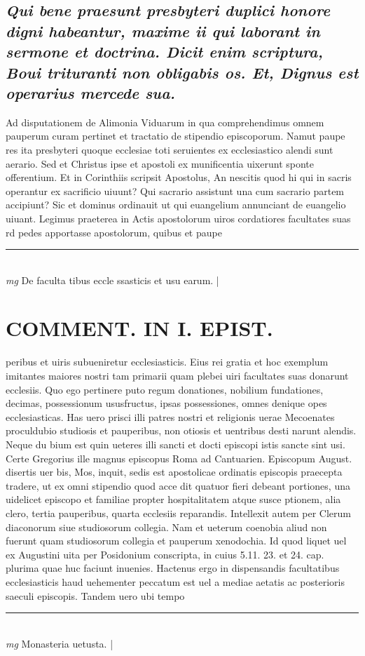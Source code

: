 \documentclass{article}
\begin{document}
\begin{pages}
\subsection*{\textit{Qui bene praesunt presbyteri duplici honore digni habeantur, maxime ii qui laborant in sermone et doctrina. Dicit enim scriptura, Boui trituranti non obligabis os. Et, Dignus est operarius mercede sua. }}\pstart Ad disputationem de Alimonia Viduarum in qua comprehendimus omnem pauperum curam pertinet et tractatio de stipendio episcoporum. Namut paupe res ita presbyteri quoque ecclesiae toti seruientes ex ecclesiastico alendi sunt aerario. Sed et Christus ipse et apostoli ex munificentia uixerunt sponte offerentium. Et in Corinthiis scripsit Apostolus, An nescitis quod hi qui in sacris operantur ex sacrificio uiuunt? Qui sacrario assistunt una cum sacrario partem accipiunt? Sic et dominus ordinauit ut qui euangelium annunciant de euangelio uiuant. Legimus praeterea in Actis apostolorum uiros cordatiores facultates suas rd pedes apportasse apostolorum, quibus et paupe\pend
\vspace{0.5cm}\noindent
\vspace{0.2cm}\rule{1cm}{0.2pt}\\ 
\hspace{0.2cm}\textit{mg}
\footnotesize De faculta tibus eccle ssasticis et usu earum. 
\normalsize| 
\section*{COMMENT. IN I. EPIST. }\pstart peribus et uiris subueniretur ecclesiasticis. Eius rei gratia et hoc exemplum imitantes maiores nostri tam primarii quam plebei uiri facultates suas donarunt ecclesiis. Quo ego pertinere puto regum donationes, nobilium fundationes, decimas, possessionum ususfructus, ipsas possessiones, omnes denique opes ecclesiasticas. Has uero prisci illi patres nostri et religionis uerae Mecoenates proculdubio studiosis et pauperibus, non otiosis et uentribus desti narunt alendis. Neque du bium est quin ueteres illi sancti et docti episcopi istis sancte sint usi. Certe Gregorius ille magnus episcopus Roma ad Cantuarien. Episcopum August. disertis uer bis, Mos, inquit, sedis est apostolicae ordinatis episcopis praecepta tradere, ut ex omni stipendio quod acce dit quatuor fieri debeant portiones, una uidelicet episcopo et familiae propter hospitalitatem atque susce ptionem, alia clero, tertia pauperibus, quarta ecclesiis reparandis. Intellexit autem per Clerum diaconorum siue studiosorum collegia. Nam et ueterum coenobia aliud non fuerunt quam studiosorum collegia et pauperum xenodochia. Id quod liquet uel ex Augustini uita per Posidonium conscripta, in cuius 5.11. 23. et 24. cap. plurima quae huc faciunt inuenies. Hactenus ergo in dispensandis facultatibus ecclesiasticis haud uehementer peccatum est uel a mediae aetatis ac posterioris saeculi episcopis. Tandem uero ubi tempo\pend
\vspace{0.5cm}\noindent
\vspace{0.2cm}\rule{1cm}{0.2pt}\\ 
\hspace{0.2cm}\textit{mg}
\footnotesize Monasteria uetusta. 
\normalsize| 

\end{pages}
\end{document}
